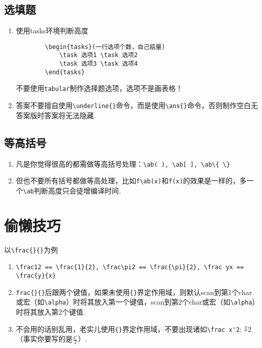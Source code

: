 \subsection{选填题}
\begin{enumerate}
	\item 使用tasks环境判断高度
	\begin{verbatim}
		\begin{tasks}(一行选项个数，自己掂量)
			\task 选项1 \task 选项2
			\task 选项3 \task 选项4
		\end{tasks}
	\end{verbatim}

	不要使用\verb|tabular|制作选择题选项，选项不是画表格！
	\item 答案不要擅自使用\verb|\underline{}|命令，而是使用\verb|\ans{}|命令，否则制作空白无答案版时答案将无法隐藏.
\end{enumerate}

\subsection{等高括号}
\begin{enumerate}
	\item 凡是你觉得很高的都需做等高括号处理：\verb|\ab( ), \ab[ ], \ab\{ \}|
	\item 但也不要所有括号都做等高处理，比如\verb|f\ab(x)|和\verb|f(x)|的效果是一样的，多一个\verb|\ab|判断高度只会徒增编译时间.
\end{enumerate}

\section{偷懒技巧}
以\verb|\frac{}{}|为例
\begin{enumerate}
	\item \verb|\frac12 == \frac{1}{2}, \frac\pi2 == \frac{\pi}{2}, \frac yx == \frac{y}{x}|
	\item \verb|frac{}{}|后跟两个键值，如果未使用\verb|{}|界定作用域，则默认scan到第1个char或宏（如\verb|\alpha|）时将其放入第一个键值，scan到第2个char或宏（如\verb|\alpha|）时将其放入第2个键值.
	\item 不会用的话别乱用，老实儿使用\verb|{}|界定作用域，不要出现诸如\verb|\frac x'2|: $\frac x'2$（事实你要写的是$\frac{x'}{2}$）.
\end{enumerate}


